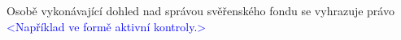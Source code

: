 \documentclass[parskip=half]{scrreprt}
\begin{document}
\begin{contract}
Osobě vykonávající dohled nad správou svěřenského fondu se vyhrazuje právo \textcolor{blue}{<Například ve formě aktivní kontroly.>}











\end{contract}
\end{document}
